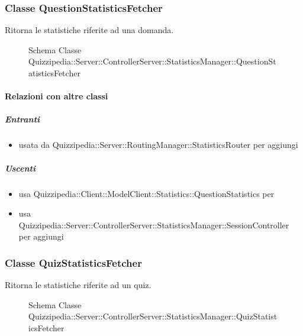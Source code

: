 \subsubsection{Classe QuestionStatisticsFetcher}
Ritorna le statistiche riferite ad una domanda.
\begin{figure}[H]
\centering
\noindent{}
\caption[Schema Classe QuestionStatisticsFetcher]{Schema Classe Quizzipedia::Server::ControllerServer::StatisticsManager::QuestionStatisticsFetcher}
\end{figure}
\paragraph{Relazioni con altre classi}
\subparagraph{Entranti}
\begin{itemize}
\item usata da Quizzipedia::Server::RoutingManager::StatisticsRouter per aggiungi
\end{itemize}
\subparagraph{Uscenti}
\begin{itemize}
\item usa Quizzipedia::Client::ModelClient::Statistics::QuestionStatistics per 
\item usa Quizzipedia::Server::ControllerServer::StatisticsManager::SessionController per aggiungi
\end{itemize}
\subsubsection{Classe QuizStatisticsFetcher}
Ritorna le statistiche riferite ad un quiz.
\begin{figure}[H]
\centering
\noindent{}
\caption[Schema Classe QuizStatisticsFetcher]{Schema Classe Quizzipedia::Server::ControllerServer::StatisticsManager::QuizStatisticsFetcher}
\end{figure}
